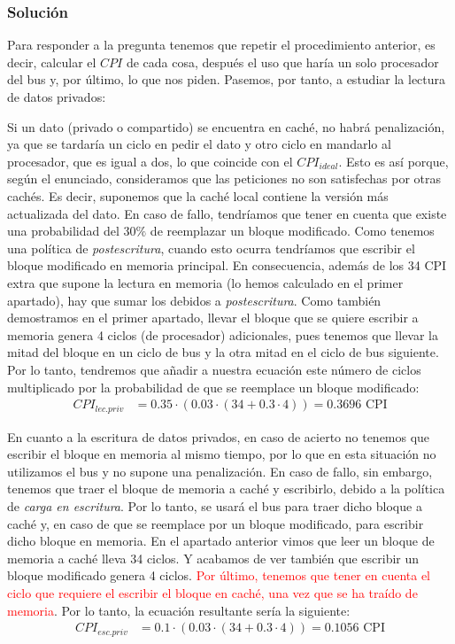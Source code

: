 \documentclass[12pt,a4paper]{article}
\begin{document}
\subsubsection{Solución}

Para responder a la pregunta tenemos que repetir el procedimiento anterior, es decir, calcular el $CPI$ de cada cosa, después el uso que haría un solo procesador del bus y, por último, lo que nos piden. Pasemos, por tanto, a estudiar la lectura de datos privados:

Si un dato (privado o compartido) se encuentra en caché, no habrá penalización, ya que se tardaría un ciclo en pedir el dato y otro ciclo en mandarlo al procesador, que es igual a dos, lo que coincide con el $CPI_{ideal}$. Esto es así porque, según el enunciado, consideramos que las peticiones no son satisfechas por otras cachés. Es decir, suponemos que la caché local contiene la versión más actualizada del dato. En caso de fallo, tendríamos que tener en cuenta que existe una probabilidad del $30\%$ de reemplazar un bloque modificado. Como tenemos una política de \textit{postescritura}, cuando esto ocurra tendríamos que escribir el bloque modificado en memoria principal. En consecuencia, además de los 34 CPI extra que supone la lectura en memoria (lo hemos calculado en el primer apartado), hay que sumar los debidos a \textit{postescritura}. Como también demostramos en el primer apartado, llevar el bloque que se quiere escribir a memoria genera 4 ciclos (de procesador) adicionales, pues tenemos que llevar la mitad del bloque en un ciclo de bus y la otra mitad en el ciclo de bus siguiente. Por lo tanto, tendremos que añadir a nuestra ecuación este número de ciclos multiplicado por la probabilidad de que se reemplace un bloque modificado:
\begin{align*}
CPI_{lec.priv}&=0.35\cdot (0.03\cdot (34 + 0.3\cdot 4))=0.3696\text{ CPI}
\end{align*}

En cuanto a la escritura de datos privados, en caso de acierto no tenemos que escribir el bloque en memoria al mismo tiempo, por lo que en esta situación no utilizamos el bus y no supone una penalización. En caso de fallo, sin embargo, tenemos que traer el bloque de memoria a caché y escribirlo, debido a la política de \textit{carga en escritura}. Por lo tanto, se usará el bus para traer dicho bloque a caché y, en caso de que se reemplace por un bloque modificado, para escribir dicho bloque en memoria. En el apartado anterior vimos que leer un bloque de memoria a caché lleva 34 ciclos. Y acabamos de ver también que escribir un bloque modificado genera 4 ciclos. \textcolor{red}{Por último, tenemos que tener en cuenta el ciclo que requiere el escribir el bloque en caché, una vez que se ha traído de memoria}. Por lo tanto, la ecuación resultante sería la siguiente:
\begin{align*}
CPI_{esc.priv}&=0.1\cdot (0.03\cdot (34+0.3\cdot 4))=0.1056\text{ CPI}
\end{align*}
\end{document}
